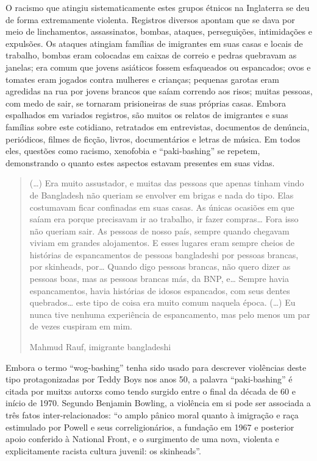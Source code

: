 O racismo que atingiu sistematicamente estes grupos étnicos na Inglaterra se deu de forma extremamente violenta. Registros diversos apontam que se dava por meio de linchamentos, assassinatos, bombas, ataques, perseguições, intimidações e expulsões. Os ataques atingiam famílias de imigrantes em suas casas e locais de trabalho, bombas eram colocadas em caixas de correio e pedras quebravam as janelas; era comum que jovens asiáticos fossem esfaqueados ou espancados; ovos e tomates eram jogados contra mulheres e crianças; pequenas garotas eram agredidas na rua por jovens brancos que saíam correndo aos risos; muitas pessoas, com medo de sair, se tornaram prisioneiras de suas próprias casas. Embora espalhados em variados registros, são muitos os relatos de imigrantes e suas famílias sobre este cotidiano, retratados em entrevistas, documentos de denúncia, periódicos, filmes de ficção, livros, documentários e letras de música. Em todos eles, questões como racismo, xenofobia e “paki-bashing” se repetem, demonstrando o quanto estes aspectos estavam presentes em suas vidas.

\begin{quote}
(…) Era muito assustador, e muitas das pessoas que apenas tinham vindo de Bangladesh não queriam se envolver em brigas e nada do tipo. Elas costumavam ficar confinadas em suas casas. As únicas ocasiões em que saíam era porque precisavam ir ao trabalho, ir fazer compras… Fora isso não queriam sair. As pessoas de nosso país, sempre quando chegavam viviam em grandes alojamentos. E esses lugares eram sempre cheios de histórias de espancamentos de pessoas bangladeshi por pessoas brancas, por skinheads, por… Quando digo pessoas brancas, não quero dizer as pessoas boas, mas as pessoas brancas más, da BNP, e… Sempre havia espancamentos, havia histórias de idosos espancados, com seus dentes quebrados… este tipo de coisa era muito comum naquela época. (…) Eu nunca tive nenhuma experiência de espancamento, mas pelo menos um par de vezes cuspiram em mim.

Mahmud Rauf, imigrante bangladeshi
\end{quote}

Embora o termo “wog-bashing” tenha sido usado para descrever violências deste tipo protagonizadas por Teddy Boys nos anos 50, a palavra “paki-bashing” é citada por muitxs autorxs como tendo surgido entre o final da década de 60 e início de 1970. Segundo Benjamin Bowling, a violência em si pode ser associada a três fatos inter-relacionados: “o amplo pânico moral quanto à imigração e raça estimulado por Powell e seus correligionários, a fundação em 1967 e posterior apoio conferido à National Front, e o surgimento de uma nova, violenta e explicitamente racista cultura juvenil: os skinheads”.

